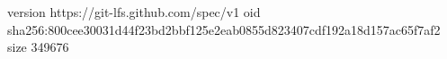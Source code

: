 version https://git-lfs.github.com/spec/v1
oid sha256:800cee30031d44f23bd2bbf125e2eab0855d823407cdf192a18d157ac65f7af2
size 349676
